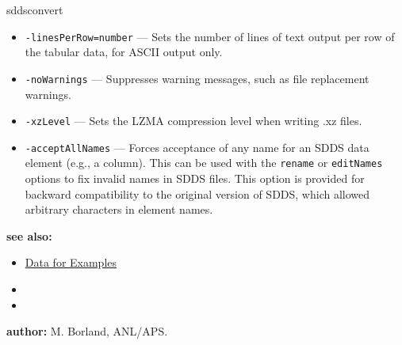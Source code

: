 \begin{sddsprog}{sddsconvert}
\begin{itemize}
    \item {\tt -linesPerRow=\rm number} --- Sets the number of lines of text output per row of the tabular data, for ASCII output only.
    \item {\tt -noWarnings} --- Suppresses warning messages, such as file replacement warnings.
    \item {\tt -xzLevel} --- Sets the LZMA compression level when writing .xz files.
    \item {\tt -acceptAllNames} --- Forces acceptance of any name for an SDDS data element (e.g., a column). This can be used with the \verb|rename| or \verb|editNames| options to fix invalid names in SDDS files. This option is provided for backward compatibility to the original version of SDDS, which allowed arbitrary characters in element names.
    \end{itemize}

  \item \textbf{see also:}
    \begin{itemize}
    \item \hyperref[exampleData]{Data for Examples}
    \item {}
    \item {}
    \end{itemize}

  \item \textbf{author:} M. Borland, ANL/APS.
\end{sddsprog}
